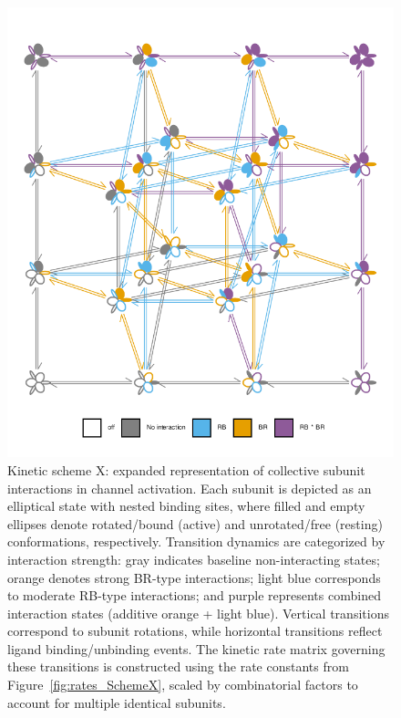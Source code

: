 \documentclass[pdflatex,sn-mathphys-num]{sn-jnl}%
\theoremstyle{thmstyleone}%
\theoremstyle{thmstyletwo}%
\theoremstyle{thmstylethree}%
\begin{document}
\begin{figure}[!htbp]
	\centering
	\includegraphics[width=\linewidth]{Figure_4_m.pdf}
	\caption{Kinetic scheme X: expanded representation of collective subunit interactions in channel activation. Each subunit is depicted as an elliptical state with nested binding sites, where filled and empty ellipses denote rotated/bound (active) and unrotated/free (resting) conformations, respectively. Transition dynamics are categorized by interaction strength: gray indicates baseline non-interacting states; orange denotes strong BR-type interactions; light blue corresponds to moderate RB-type interactions; and purple represents combined interaction states (additive orange + light blue). Vertical transitions correspond to subunit rotations, while horizontal transitions reflect ligand binding/unbinding events. The kinetic rate matrix governing these transitions is constructed using the rate constants from Figure~\ref{fig:rates_SchemeX}, scaled by combinatorial factors to account for multiple identical subunits.}
	
	\label{fig:SchemeX_full}
\end{figure}
\end{document}
